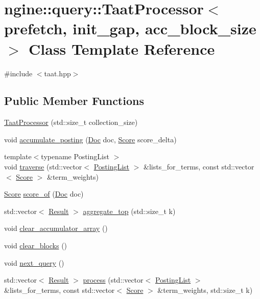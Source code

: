 \hypertarget{classngine_1_1query_1_1TaatProcessor}{}\section{ngine\+:\+:query\+:\+:Taat\+Processor$<$ prefetch, init\+\_\+gap, acc\+\_\+block\+\_\+size $>$ Class Template Reference}
\label{classngine_1_1query_1_1TaatProcessor}


{\ttfamily \#include $<$taat.\+hpp$>$}

\subsection*{Public Member Functions}
\begin{DoxyCompactItemize}
\item 
\hyperlink{classngine_1_1query_1_1TaatProcessor_a0bf77a30ee770c13ba6c3be542a582fa}{Taat\+Processor} (std\+::size\+\_\+t collection\+\_\+size)
\item 
void \hyperlink{classngine_1_1query_1_1TaatProcessor_aa5b4f79585c4f2726d5c311944e0a290}{accumulate\+\_\+posting} (\hyperlink{structngine_1_1Doc}{Doc} doc, \hyperlink{structngine_1_1Score}{Score} score\+\_\+delta)
\item 
{\footnotesize template$<$typename Posting\+List $>$ }\\void \hyperlink{classngine_1_1query_1_1TaatProcessor_a8a7e81f810fcef5c98f1221290a793bd}{traverse} (std\+::vector$<$ \hyperlink{classngine_1_1PostingList}{Posting\+List} $>$ \&lists\+\_\+for\+\_\+terms, const std\+::vector$<$ \hyperlink{structngine_1_1Score}{Score} $>$ \&term\+\_\+weights)
\item 
\hyperlink{structngine_1_1Score}{Score} \hyperlink{classngine_1_1query_1_1TaatProcessor_ac1bb007d7ea3547da5f2775ae8523263}{score\+\_\+of} (\hyperlink{structngine_1_1Doc}{Doc} doc)
\item 
std\+::vector$<$ \hyperlink{structngine_1_1query_1_1Result}{Result} $>$ \hyperlink{classngine_1_1query_1_1TaatProcessor_a567261dd90dbc6fc3b23d55e77fd67d0}{aggregate\+\_\+top} (std\+::size\+\_\+t k)
\item 
void \hyperlink{classngine_1_1query_1_1TaatProcessor_ae01f8ddf4819e6e39491868f5d8a1b70}{clear\+\_\+accumulator\+\_\+array} ()
\item 
void \hyperlink{classngine_1_1query_1_1TaatProcessor_ab0ea4bca10ac19437a1faa01c127582b}{clear\+\_\+blocks} ()
\item 
void \hyperlink{classngine_1_1query_1_1TaatProcessor_a3da5bb7b4011850c7ffe46b4838ec4d2}{next\+\_\+query} ()
\item 
std\+::vector$<$ \hyperlink{structngine_1_1query_1_1Result}{Result} $>$ \hyperlink{classngine_1_1query_1_1TaatProcessor_a2e0b564f5d5ff281ef1d693808720382}{process} (std\+::vector$<$ \hyperlink{classngine_1_1PostingList}{Posting\+List} $>$ \&lists\+\_\+for\+\_\+terms, const std\+::vector$<$ \hyperlink{structngine_1_1Score}{Score} $>$ \&term\+\_\+weights, std\+::size\+\_\+t k)
\end{DoxyCompactItemize}
